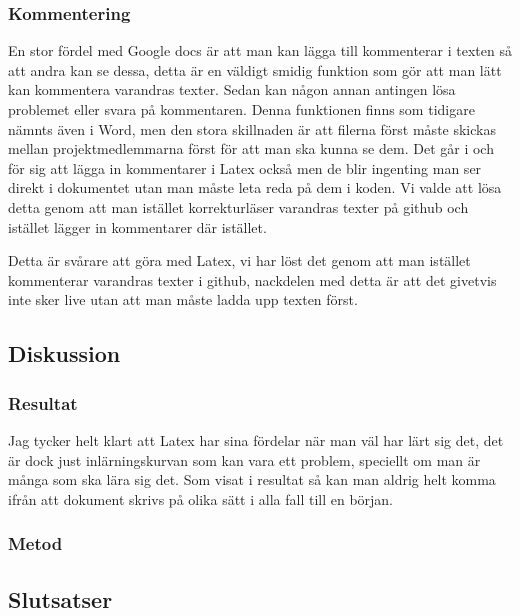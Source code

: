 \subsubsection{Kommentering}
En stor fördel med Google docs är att man kan lägga till kommenterar i texten så att andra kan se dessa, detta är en väldigt smidig funktion som gör att man lätt kan kommentera varandras texter. Sedan kan någon annan antingen lösa problemet eller svara på kommentaren. Denna funktionen finns som tidigare nämnts även i Word, men den stora skillnaden är att filerna först måste skickas mellan projektmedlemmarna först för att man ska kunna se dem. Det går i och för sig att lägga in kommentarer i Latex också men de blir ingenting man ser direkt i dokumentet utan man måste leta reda på dem i koden. Vi valde att lösa detta genom att man istället korrekturläser varandras texter på github och istället lägger in kommentarer där istället.


Detta är svårare att göra med Latex, vi har löst det genom att man istället kommenterar varandras texter i github, nackdelen med detta är att det givetvis inte sker live utan att man måste ladda upp texten först.

\subsection{Diskussion}
\subsubsection{Resultat}
Jag tycker helt klart att Latex har sina fördelar när man väl har lärt sig det, det är dock just inlärningskurvan som kan vara ett problem, speciellt om man är många som ska lära sig det. Som visat i resultat så kan man aldrig helt komma ifrån att dokument skrivs på olika sätt i alla fall till en början.

\subsubsection{Metod}
\subsection{Slutsatser}
